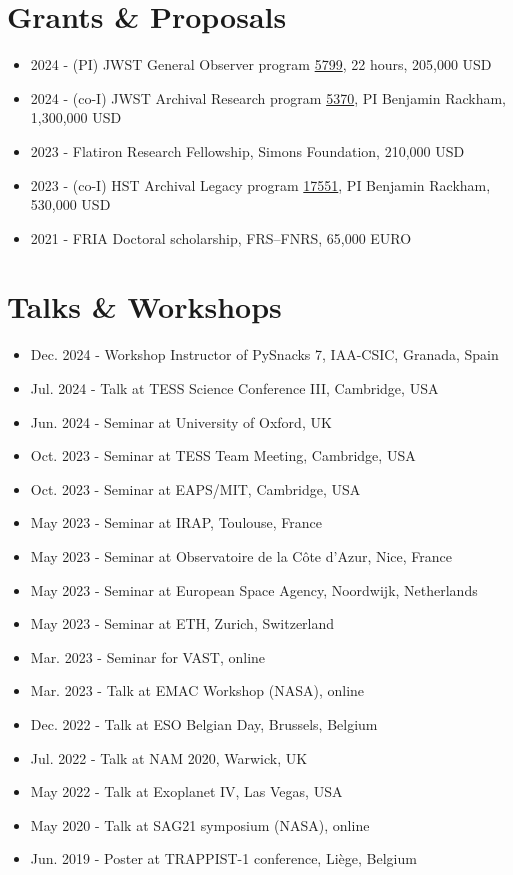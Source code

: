 \documentclass[10pt,letterpaper]{article}
\begin{document}
\section*{Grants \& Proposals}
\begin{itemize}
    \item 2024 - (PI) JWST General Observer program \href{https://www.stsci.edu/jwst/science-execution/program-information?id=5799}{5799}, 22 hours, 205,000 USD
    \item 2024 - (co-I) JWST Archival Research program \href{https://www.stsci.edu/jwst/science-execution/program-information?id=5370}{5370}, PI Benjamin Rackham, 1,300,000 USD
    \item 2023 - Flatiron Research Fellowship, Simons Foundation, 210,000 USD
    \item 2023 - (co-I) HST Archival Legacy program \href{https://www.stsci.edu/cgi-bin/get-proposal-info?id=17551&observatory=HST}{17551}, PI Benjamin Rackham, 530,000 USD
    \item 2021 - FRIA Doctoral scholarship, FRS–FNRS, 65,000 EURO
\end{itemize}
\section*{Talks \& Workshops}
\begin{itemize}
    \item Dec. 2024 - Workshop Instructor of PySnacks 7, IAA-CSIC, Granada, Spain
    \item Jul. 2024 - Talk at TESS Science Conference III, Cambridge, USA
    \item Jun. 2024 - Seminar at University of Oxford, UK
    \item Oct. 2023 - Seminar at TESS Team Meeting, Cambridge, USA
    \item Oct. 2023 - Seminar at EAPS/MIT, Cambridge, USA
    \item May 2023 - Seminar at IRAP, Toulouse, France
    \item May 2023 - Seminar at Observatoire de la Côte d'Azur, Nice, France
    \item May 2023 - Seminar at European Space Agency, Noordwijk, Netherlands
    \item May 2023 - Seminar at ETH, Zurich, Switzerland
    \item Mar. 2023 - Seminar for VAST, online
    \item Mar. 2023 - Talk at EMAC Workshop (NASA), online
    \item Dec. 2022 - Talk at ESO Belgian Day, Brussels, Belgium
    \item Jul. 2022 - Talk at NAM 2020, Warwick, UK
    \item May 2022 - Talk at Exoplanet IV, Las Vegas, USA
    \item May 2020 - Talk at SAG21 symposium (NASA), online
    \item Jun. 2019 - Poster at TRAPPIST-1 conference, Liège, Belgium
\end{itemize}
\end{document}
